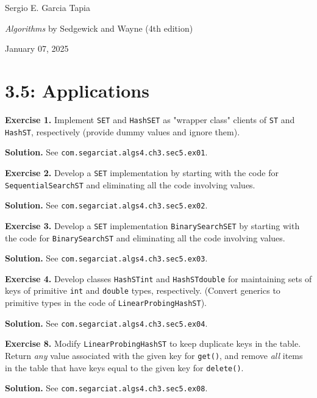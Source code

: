 \documentclass[12pt, a4paper]{article}
\newenvironment{ex}[2][Exercise]
{\par\medskip\noindent \textbf{#1 #2.}}
{\medskip}
\newenvironment{sol}[1][Solution]
{\par\medskip\noindent \textbf{#1.} }
{\medskip}
\begin{document}
	\noindent Sergio E. Garcia Tapia \hfill
	
	\noindent \emph{Algorithms} by Sedgewick and Wayne (4th edition) \cite{sedgewick_wayne}\hfill
	
	\noindent January 07, 2025\hfill 
	\section*{3.5: Applications}
	\begin{ex}{1}
		Implement \texttt{SET} and \texttt{HashSET} as "wrapper class" clients of \texttt{ST}
		and \texttt{HashST}, respectively (provide dummy values and ignore them).
	\end{ex}
	\begin{sol}
		See \texttt{com.segarciat.algs4.ch3.sec5.ex01}.
	\end{sol}
	\begin{ex}{2}
		Develop a \texttt{SET} implementation by starting with the code for \texttt{SequentialSearchST}
		and eliminating all the code involving values.
	\end{ex}
	\begin{sol}
		See \texttt{com.segarciat.algs4.ch3.sec5.ex02}.
	\end{sol}
	\begin{ex}{3}
		Develop a \texttt{SET} implementation \texttt{BinarySearchSET} by starting with the code for
		\texttt{BinarySearchST} and eliminating all the code involving values.
	\end{ex}
	\begin{sol}
		See \texttt{com.segarciat.algs4.ch3.sec5.ex03}.
	\end{sol}
	\begin{ex}{4}
		Develop classes \texttt{HashSTint} and \texttt{HashSTdouble} for maintaining sets of keys of
		primitive \texttt{int} and \texttt{double} types, respectively. (Convert generics to primitive
		types in the code of \texttt{LinearProbingHashST}).
	\end{ex}
	\begin{sol}
		See \texttt{com.segarciat.algs4.ch3.sec5.ex04}.
	\end{sol}
	\begin{ex}{8}
		Modify \texttt{LinearProbingHashST} to keep duplicate keys in the table.
		Return \emph{any} value associated with the given key for \texttt{get()}, and
		remove \emph{all} items in the table that have keys equal to the given
		key for \texttt{delete()}.
	\end{ex}
	\begin{sol}
		See \texttt{com.segarciat.algs4.ch3.sec5.ex08}.
	\end{sol}
\end{document}
